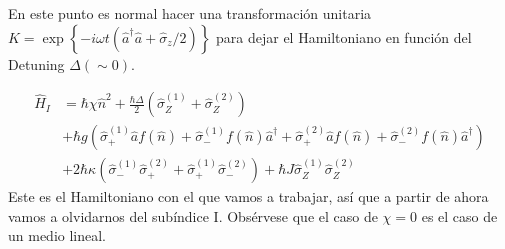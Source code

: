 En este punto es normal hacer una transformaci\'on unitaria  $K = \exp\left\{-i \omega t (\hat a^\dagger \hat a + \hat \sigma_z/2)\right\}$ para dejar el Hamiltoniano en funci\'on del Detuning $\Delta (\sim 0)$. 

\begin{equation}
\begin{split}
     \hat H_I & =\hbar \chi \hat n^2+\frac{\hbar \Delta}{2}(\hat\sigma_Z^{(1)}+\hat\sigma_Z^{(2)})   \\ 
     & + \hbar g(\hat\sigma_+^{(1)}\hat a f(\hat n)+\hat\sigma_-^{(1)}f(\hat n) \hat a^\dagger + \hat\sigma_+^{(2)}\hat a f(\hat n)+\hat\sigma_-^{(2)}f(\hat n) \hat a^\dagger) \\ 
 & + 2\hbar \kappa (\hat \sigma_-^{(1)}\hat \sigma_+^{(2)}+\hat \sigma_+^{(1)}\hat \sigma_-^{(2)}) + \hbar J \hat \sigma_Z^{(1)}\hat \sigma_Z^{(2)}
\end{split}
\end{equation}\label{eq4:H}
Este es el Hamiltoniano con el que vamos a trabajar, así que a partir de ahora vamos a olvidarnos del subíndice I. Obsérvese que el caso de $\chi=0$ es el caso de un medio lineal. 


